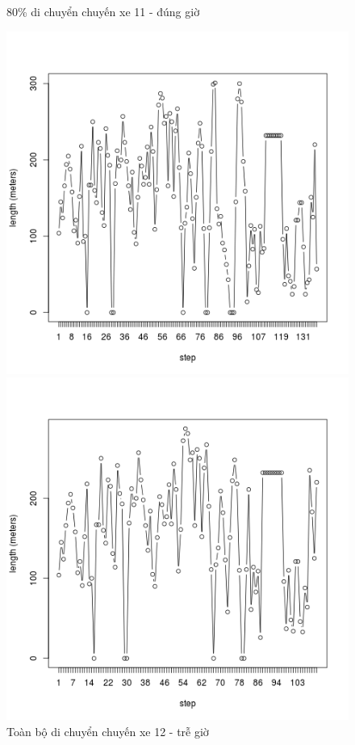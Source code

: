 \documentclass[a4paper, 13pt]{report}
\begin{document}
\begin{figure}[!htb]
  \caption*{80\% di chuyển chuyến xe 11 - đúng giờ}
\endminipage
{}%
  \includegraphics[width=\linewidth]{test_100_12}
  \caption*{Toàn bộ di chuyển chuyến xe 12 - trễ giờ}
\endminipage
{}
  \includegraphics[width=\linewidth]{test_80_12}

\end{figure}
\end{document}
